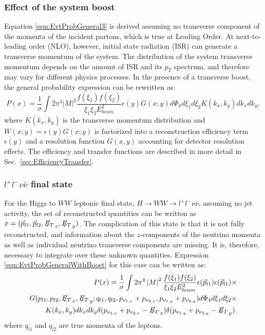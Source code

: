 \documentclass{cmspaper}
\newcommand{\met}{\mbox{$E_T\hspace{-1.1em}/$\hspace{0.7em}}}
\begin{document}
\subsubsection{Effect of the system boost}
Equation \ref{eqn:EvtProbGeneral3} is derived assuming no transverse component of the momenta of the incident partons,
which is true at Leading Order.   At next-to-leading order (NLO), however, initial state radiation (ISR) can generate a transverse momentum
of the system.  The distribution of the system transverse momentum depends on the amount of ISR and its $p_{T}$ spectrum, and
therefore may vary for different physics processes. In the presence of a transverse boost, the general probability expression can
be rewritten as:
\begin{equation}
P(x)=\frac{1}{\sigma }\int 2 \pi^{4} \left| M \right|^{2} \frac{f(\xi_{1})f(\xi_{2})}{\xi_{1}\xi_{2}E_{beam}^{2}}\epsilon(y)G(x;y)d\Phi_{4}d\xi_{1}d\xi_{2}K(k_{x},k_{y})dk_{x}dk_{y},
\label{eqn:EvtProbGeneralWithBoost}  
\end{equation}
where $K(k_{x},k_{y})$ is the transverse momentum distribution and $W(x;y)=\epsilon(y)G(x;y)$ is factorized into a reconstruction 
efficiency term $\epsilon(y)$ and a resolution function $G(x,y)$ accounting for detector resolution effects.
The efficiency and transfer functions are described in more detail in Sec.~\ref{sec:EfficiencyTransfer}.

\subsubsection{$l^{+}l^{-}\nu\bar{\nu}$ final state }
For the Higgs to $WW$ leptonic final state, $H \rightarrow WW \rightarrow l^{+}l^{-}\nu\bar{\nu}$, assuming no jet activity, 
the set of reconstructed quantities can be written as $x=(\vec{p}_{l1},\vec{p}_{l2}, \met_{x},  \met_{y})$.
The complication of this state is that it is not fully reconstructed, and information about the $z$-components of the neutrino 
momenta as well as individual neutrino transverse components are missing. It is, therefore, necessary to integrate over these 
unknown quantities. Expression \ref{eqn:EvtProbGeneralWithBoost} for this case can be written as:
\begin{eqnarray}
P(x)=\frac{1}{\sigma }\int 2 \pi^{4} \left| M \right|^{2} \frac{f(\xi_{1})f(\xi_{2})}{\xi_{1}\xi_{2}E_{beam}^{2}}
\epsilon(\vec{p}_{l1})\epsilon(\vec{p}_{l1}) \times \nonumber \\ 
                         G(p_{l1},p_{l2}, \met_{x},  \met_{y}; q_{l1}, q_{l2}, p_{\nu_{1,x}}+  p_{\nu_{2,x}}, p_{\nu_{1,y}}+p_{\nu_{2,y}})d\Phi_{4}d\xi_{1}d\xi_{2} \times \nonumber \\
                         K(k_{x},k_{y})dk_{x}dk_{y}\delta(p_{\nu_{1,x}}+p_{\nu_{2,x}}-\met_{x})\delta(p_{\nu_{1,y}}+p_{\nu_{2,y}}-\met_{y}).
\label{eqn:EvtProbGeneralWithBoost2L2nu}  
\end{eqnarray}
where $q_{l1}$ and $q_{l2}$ are true momenta of the leptons.
\end{document}
